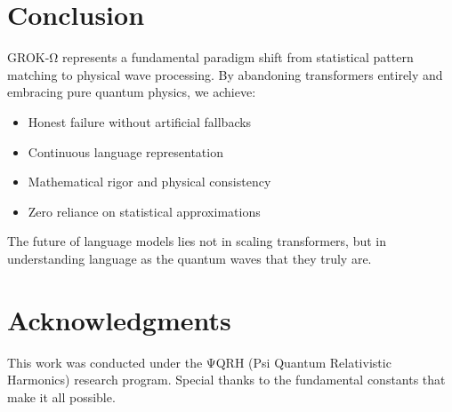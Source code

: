 \documentclass[11pt,a4paper]{article}
\begin{document}
\section{Conclusion}

GROK-Ω represents a fundamental paradigm shift from statistical pattern matching to physical wave processing. By abandoning transformers entirely and embracing pure quantum physics, we achieve:

\begin{itemize}
\item Honest failure without artificial fallbacks
\item Continuous language representation
\item Mathematical rigor and physical consistency
\item Zero reliance on statistical approximations
\end{itemize}

The future of language models lies not in scaling transformers, but in understanding language as the quantum waves that they truly are.

\section*{Acknowledgments}

This work was conducted under the ΨQRH (Psi Quantum Relativistic Harmonics) research program. Special thanks to the fundamental constants that make it all possible.



\end{document}
